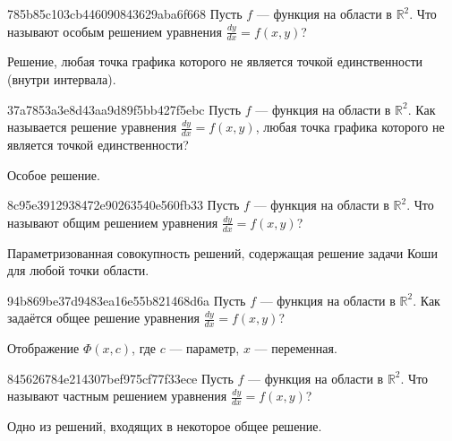 \begin{note}{785b85c103cb446090843629aba6f668}
    Пусть \({ f }\) --- функция на области в \({ \mathbb R^2 }\).
    Что называют особым решением уравнения \({ \frac{dy}{dx} = f(x, y) }\)?

    \begin{cloze}{1}
        Решение, любая точка графика которого не является точкой единственности (внутри интервала).
    \end{cloze}
\end{note}

\begin{note}{37a7853a3e8d43aa9d89f5bb427f5ebc}
    Пусть \({ f }\) --- функция на области в \({ \mathbb R^2 }\).
    Как называется решение уравнения \({ \frac{dy}{dx} = f(x, y) }\), любая точка графика которого не является точкой единственности?

    \begin{cloze}{1}
        Особое решение.
    \end{cloze}
\end{note}

\begin{note}{8c95e3912938472e90263540e560fb33}
    Пусть \({ f }\) --- функция на области в \({ \mathbb R^2 }\).
    Что называют общим решением уравнения \({ \frac{dy}{dx} = f(x, y) }\)?

    \begin{cloze}{1}
        Параметризованная совокупность решений, содержащая решение задачи Коши для любой точки области.
    \end{cloze}
\end{note}

\begin{note}{94b869be37d9483ea16e55b821468d6a}
    Пусть \({ f }\) --- функция на области в \({ \mathbb R^2 }\).
    Как задаётся общее решение уравнения \({ \frac{dy}{dx} = f(x, y) }\)?

    \begin{cloze}{1}
        Отображение \({ \Phi(x, c) }\), где \({ c }\) --- параметр, \({ x }\) --- переменная.
    \end{cloze}
\end{note}

\begin{note}{845626784e214307bef975cf77f33ece}
    Пусть \({ f }\) --- функция на области в \({ \mathbb R^2 }\).
    Что называют частным решением уравнения \({ \frac{dy}{dx} = f(x, y) }\)?

    \begin{cloze}{1}
        Одно из решений, входящих в некоторое общее решение.
    \end{cloze}
\end{note}

